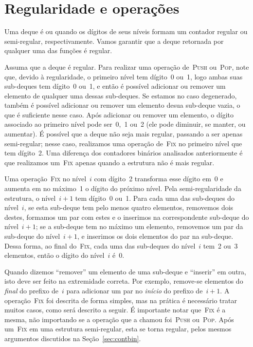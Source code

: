 \documentclass[main.tex]{subfiles}
\begin{document}
\section{Regularidade e operações} \label{sec:reg_op}

Uma deque é  ou  quando os dígitos de seus níveis formam um contador regular ou semi-regular, respectivamente. Vamos garantir que a deque retornada por qualquer uma das funções é regular.

Assuma que a deque é regular. Para realizar uma operação de~\textsc{Push} ou~\textsc{Pop}, note que, devido à regularidade, o primeiro nível tem dígito~0 ou~1, logo ambas suas sub-deques tem dígito~0 ou~1, e então é possível adicionar ou remover um elemento de qualquer uma dessas sub-deques. Se estamos no caso degenerado, também é possível adicionar ou remover um elemento desua sub-deque vazia, o que é suficiente nesse caso.
Após adicionar ou remover um elemento, o dígito associado ao primeiro nível pode ser~0,~1 ou~2 (ele pode diminuir, se manter, ou aumentar). É possível que a deque não seja mais regular, passando a ser apenas semi-regular; nesse caso, realizamos uma operação de~\textsc{Fix} no primeiro nível que tem dígito~2. Uma diferença dos contadores binários analisados anteriormente é que realizamos um~\textsc{Fix} apenas quando a estrutura não é mais regular.

Uma operação~\textsc{Fix} no nível~$i$ com dígito~2 transforma esse dígito em~0 e aumenta em no máximo~1 o dígito do próximo nível. Pela semi-regularidade da estrutura, o nível~$i+1$ tem dígito~0 ou~1. Para cada uma das sub-deques do nível~$i$, se esta sub-deque tem pelo menos quatro elementos, removemos dois destes, formamos um par com estes e o inserimos na correspondente sub-deque do nível~$i+1$; se a sub-deque tem no máximo um elemento, removemos um par da sub-deque do nível~$i+1$, e inserimos os dois elementos do par na sub-deque. Dessa forma, ao final do~\textsc{Fix}, cada uma das sub-deques do nível~$i$ tem~2 ou~3 elementos, então o dígito do nível~$i$ é~0.

Quando dizemos ``remover'' um elemento de uma sub-deque e ``inserir'' em outra, isto deve ser feito na extremidade correta. Por exemplo, remove-se elementos do \emph{final} do prefixo de~$i$ para adicionar um par no \emph{início} do prefixo de~$i+1$. A operação~\textsc{Fix} foi descrita de forma simples, mas na prática é necessário tratar muitos casos, como será descrito a seguir. É importante notar que~\textsc{Fix} é a mesma, não importando se a operação que a chamou foi~\textsc{Push} ou~\textsc{Pop}. Após um~\textsc{Fix} em uma estrutura semi-regular, esta se torna regular, pelos mesmos argumentos discutidos na Seção~\ref{sec:contbin}.
\end{document}
